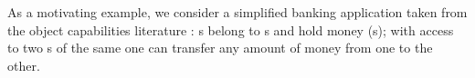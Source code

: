 

As a motivating example, we consider a simplified banking application 
taken from the object capabilities literature \cite{ELang}:
 s belong to s and hold money (s);  
with access  to two s of the same   one can  transfer any amount of money from
 one to the other.  %

%
%


